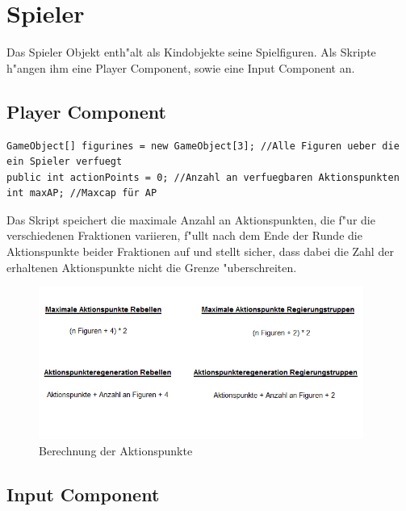\chapter{Spieler}

Das Spieler Objekt enth"alt als Kindobjekte seine Spielfiguren. Als Skripte h"angen ihm eine Player Component, sowie eine Input Component an. 
\section{Player Component}
\begin{lstlisting}[breaklines=true]
GameObject[] figurines = new GameObject[3]; //Alle Figuren ueber die ein Spieler verfuegt
public int actionPoints = 0; //Anzahl an verfuegbaren Aktionspunkten
int maxAP; //Maxcap für AP
\end{lstlisting}
Das Skript speichert die maximale Anzahl an Aktionspunkten, die f"ur die verschiedenen Fraktionen variieren, f"ullt nach dem Ende der Runde die Aktionspunkte beider Fraktionen auf und stellt sicher, dass dabei die Zahl der erhaltenen Aktionspunkte nicht die Grenze "uberschreiten. 

\begin{figure}
	\centering
	\includegraphics[height=5cm]{images/Aktionspunkte.png}
	\caption{Berechnung der Aktionspunkte}
	\label{fig:Aktionspunkte}
\end{figure}

\section{Input Component}


